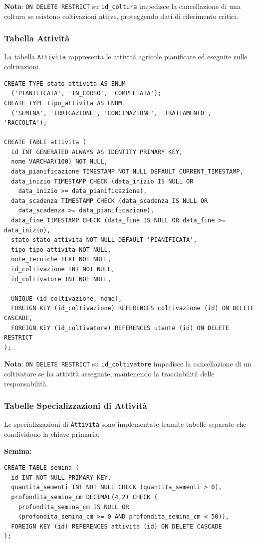 \documentclass[12pt,a4paper]{article}
\begin{document}
\textbf{Nota}: \texttt{ON DELETE RESTRICT} su \texttt{id\_coltura} impedisce la cancellazione di una coltura se esistono coltivazioni attive, proteggendo dati di riferimento critici.

\subsubsection{Tabella Attività}

La tabella \texttt{Attivita} rappresenta le attività agricole pianificate ed eseguite sulle coltivazioni.

\begin{lstlisting}[style=sqlstyle]
CREATE TYPE stato_attivita AS ENUM 
  ('PIANIFICATA', 'IN_CORSO', 'COMPLETATA');
CREATE TYPE tipo_attivita AS ENUM 
  ('SEMINA', 'IRRIGAZIONE', 'CONCIMAZIONE', 'TRATTAMENTO', 'RACCOLTA');

CREATE TABLE attivita (
  id INT GENERATED ALWAYS AS IDENTITY PRIMARY KEY,
  nome VARCHAR(100) NOT NULL,
  data_pianificazione TIMESTAMP NOT NULL DEFAULT CURRENT_TIMESTAMP,
  data_inizio TIMESTAMP CHECK (data_inizio IS NULL OR 
    data_inizio >= data_pianificazione),
  data_scadenza TIMESTAMP CHECK (data_scadenza IS NULL OR 
    data_scadenza >= data_pianificazione),
  data_fine TIMESTAMP CHECK (data_fine IS NULL OR data_fine >= data_inizio),
  stato stato_attivita NOT NULL DEFAULT 'PIANIFICATA', 
  tipo tipo_attivita NOT NULL,
  note_tecniche TEXT NOT NULL,
  id_coltivazione INT NOT NULL,
  id_coltivatore INT NOT NULL,
  
  UNIQUE (id_coltivazione, nome),
  FOREIGN KEY (id_coltivazione) REFERENCES coltivazione (id) ON DELETE CASCADE,
  FOREIGN KEY (id_coltivatore) REFERENCES utente (id) ON DELETE RESTRICT
);
\end{lstlisting}

\textbf{Nota}: \texttt{ON DELETE RESTRICT} su \texttt{id\_coltivatore} impedisce la cancellazione di un coltivatore se ha attività assegnate, mantenendo la tracciabilità delle responsabilità.

\subsubsection{Tabelle Specializzazioni di Attività}

Le specializzazioni di \texttt{Attivita} sono implementate tramite tabelle separate che condividono la chiave primaria:

\textbf{Semina:}
\begin{lstlisting}[style=sqlstyle]
CREATE TABLE semina (
  id INT NOT NULL PRIMARY KEY,
  quantita_sementi INT NOT NULL CHECK (quantita_sementi > 0),
  profondita_semina_cm DECIMAL(4,2) CHECK (
    profondita_semina_cm IS NULL OR 
    (profondita_semina_cm >= 0 AND profondita_semina_cm < 50)),
  FOREIGN KEY (id) REFERENCES attivita (id) ON DELETE CASCADE 
);
\end{lstlisting}
\end{document}
